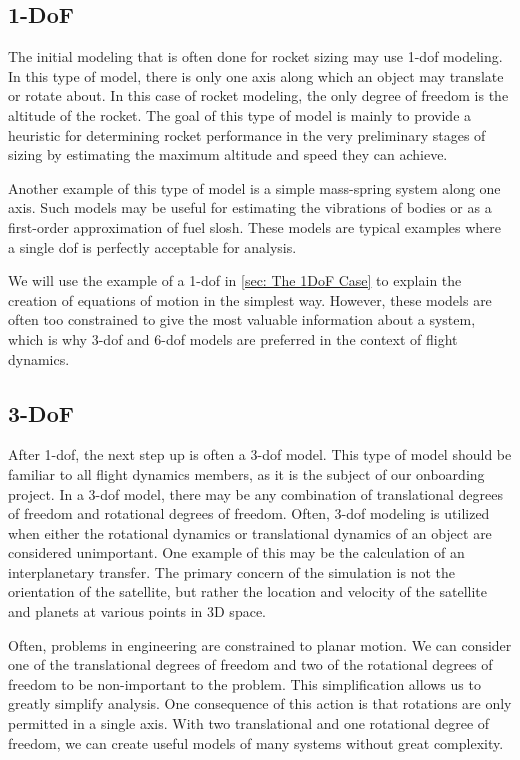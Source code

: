 \documentclass[10pt, openany, titlepage]{book}
\theoremstyle{definition}
\newcounter{example}[chapter]
\let\oldautoref\autoref
\renewcommand{\autoref}[1]{%
  \begingroup
  \hypersetup{linkcolor=black}%
  \oldautoref{#1}%
  \endgroup
}
\begin{document}
\subsection{1-DoF}\label{overview: 1dof}
The initial modeling that is often done for rocket sizing may use 1-\gls{dof} modeling. In this type of model, there is only one axis along which an object may translate or rotate about. In this case of rocket modeling, the only degree of freedom is the altitude of the rocket. The goal of this type of model is mainly to provide a heuristic for determining rocket performance in the very preliminary stages of sizing by estimating the maximum altitude and speed they can achieve.

Another example of this type of model is a simple mass-spring system along one axis. Such models may be useful for estimating the vibrations of bodies or as a first-order approximation of fuel slosh. These models are typical examples where a single \gls{dof} is perfectly acceptable for analysis.

We will use the example of a 1-\gls{dof} in \autoref{sec: The 1DoF Case} to explain the creation of equations of motion in the simplest way. However, these models are often too constrained to give the most valuable information about a system, which is why 3-\gls{dof} and 6-\gls{dof} models are preferred in the context of flight dynamics.
\subsection{3-DoF}
After 1-\gls{dof}, the next step up is often a 3-\gls{dof} model. This type of model should be familiar to all flight dynamics members, as it is the subject of our onboarding project. In a 3-\gls{dof} model, there may be any combination of translational degrees of freedom and rotational degrees of freedom. Often, 3-\gls{dof} modeling is utilized when either the rotational dynamics or translational dynamics of an object are considered unimportant. One example of this may be the calculation of an interplanetary transfer. The primary concern of the simulation is not the orientation of the satellite, but rather the location and velocity of the satellite and planets at various points in 3D space. 

Often, problems in engineering are constrained to planar motion. We can consider one of the translational degrees of freedom and two of the rotational degrees of freedom to be non-important to the problem. This simplification allows us to greatly simplify analysis. One consequence of this action is that rotations are only permitted in a single axis. With two translational and one rotational degree of freedom, we can create useful models of many systems without great complexity.
\end{document}
